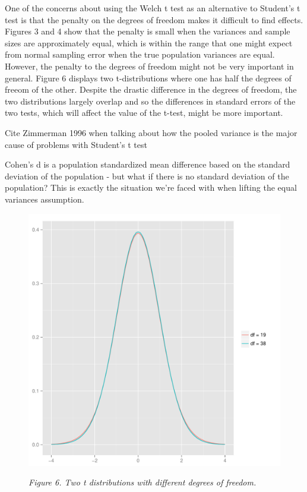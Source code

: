 \documentclass[man,a4paper,noextraspace,apacite]{apa6}\usepackage[]{graphicx}\usepackage[]{color}
\makeatletter
\def\maxwidth{ %
  \ifdim\Gin@nat@width>\linewidth
    \linewidth
  \else
    \Gin@nat@width
  \fi
}
\newenvironment{knitrout}{}{} %
\makeatother
\begin{document}
    One of the concerns about using the Welch t test as an alternative to Student's t test is that the penalty on the degrees of freedom makes it difficult to find effects. Figures 3 and 4 show that the penalty is small when the variances and sample sizes are approximately equal, which is within the range that one might expect from normal sampling error when the true population variances are equal. However, the penalty to the degrees of freedom might not be very important in general. Figure 6 displays two t-distributions where one has half the degrees of freeom of the other. Despite the drastic difference in the degrees of freedom, the two distributions largely overlap and so the differences in standard errors of the two tests, which will affect the value of the t-test, might be more important.
    
    Cite Zimmerman 1996 when talking about how the pooled variance is the major cause of problems with Student's t test
    
    Cohen's d is a population standardized mean difference based on the standard deviation of the population - but what if there is no standard deviation of the population? This is exactly the situation we're faced with when lifting the equal variances assumption.
  
\begin{figure}  
\begin{knitrout}
\color{fgcolor}
\includegraphics[width=\maxwidth]{figure/tdist} 

\end{knitrout}
\textit{Figure 6. Two t distributions with different degrees of freedom.}
\end{figure}






\end{document}

